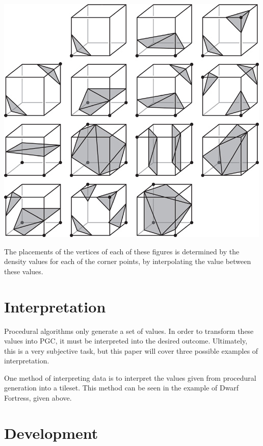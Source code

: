 \documentclass[10pt]{report}
\begin{document}
		\begin{minipage}{\textwidth}
			\centering
			\includegraphics[scale=0.75]{01fig04}
			\label{fig:01fig04}
		\end{minipage}
	
		The placements of the vertices of each of these figures is determined by the density values for each of the corner points, by interpolating the value between these values.
		
	\vspace{10pt}
	\let\clearpage\relax
	\chapter{Interpretation} \label{chap:interpret}
		
		Procedural algorithms only generate a set of values. In order to transform these values into PGC, it must be interpreted into the desired outcome. Ultimately, this is a very subjective task, but this paper will cover three possible examples of interpretation. 
		
		One method of interpreting data is to interpret the values given from procedural generation into a tileset. This method can be seen in the example of Dwarf Fortress, given above. 
	\vspace{10pt}
	\let\clearpage\relax
	\chapter{Development}
		
\end{document}
